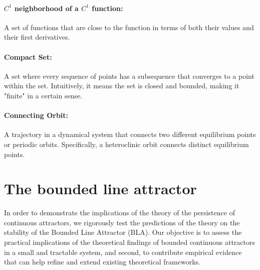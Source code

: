 \documentclass{article} %
\newcommand{\ascomment}[1]{\textcolor{ascolor}{(#1)}}
\newcounter{ct}
\theoremstyle{definition}
\theoremstyle{remark}
\begin{document}
\paragraph{$C^1$ neighborhood of a $C^1$ function:} A set of functions that are close to the function in terms of both their values and their first derivatives.

\paragraph{Compact Set:} A set where every sequence of points has a subsequence that converges to a point within the set. Intuitively, it means the set is closed and bounded, making it "finite" in a certain sense.

\paragraph{Connecting Orbit:} A trajectory in a dynamical system that connects two different equilibrium points or periodic orbits. 
 Specifically, a heteroclinic orbit connects distinct equilibrium points.






\newpage
\section{The bounded line attractor}\label{sec:supp:bla}
In order to demonstrate the implications of the theory of the persistence of  continuous attractors, we rigorously test the predictions of the theory on the stability of the Bounded Line Attractor (BLA).
Our objective is to assess the practical implications of the theoretical findings of bounded continuous attractors in a small and tractable system, and second, to contribute empirical evidence that can help refine and extend existing theoretical frameworks.
\end{document}

